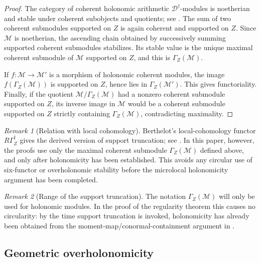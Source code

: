 \documentclass[11pt]{amsart}
\theoremstyle{plain}
\theoremstyle{definition}
\theoremstyle{remark}
\newtheorem{remark}{Remark}[section]
\begin{document}
\begin{proof}
The category of coherent holonomic arithmetic \(\mathscr D^\dagger\)-modules is
noetherian and stable under coherent subobjects and quotients; see
\cite[Th\'eor\`eme 2.2.14]{CaroHolonomieSansFrobenius}.  The sum of two
coherent submodules supported on \(Z\) is again coherent and supported on
\(Z\).  Since \(\mathcal M\) is noetherian, the ascending chain obtained by
successively summing supported coherent submodules stabilizes.  Its stable value
is the unique maximal coherent submodule of \(\mathcal M\) supported on \(Z\),
and this is \(\Gamma_Z(\mathcal M)\).

If \(f:\mathcal M\to\mathcal M'\) is a morphism of holonomic coherent modules,
the image \(f(\Gamma_Z(\mathcal M))\) is supported on \(Z\), hence lies in
\(\Gamma_Z(\mathcal M')\).  This gives functoriality.  Finally, if the quotient
\(\mathcal M/\Gamma_Z(\mathcal M)\) had a nonzero coherent submodule supported
on \(Z\), its inverse image in \(\mathcal M\) would be a coherent submodule
supported on \(Z\) strictly containing \(\Gamma_Z(\mathcal M)\), contradicting
maximality.
\end{proof}

\begin{remark}[Relation with local cohomology]
\label{rem:gamma-Z-local-cohomology}
Berthelot's local-cohomology functor \(R\Gamma_Z^\dagger\) gives the derived
version of support truncation; see \cite[\S2.1, Lemmas 2.1.1--2.1.2]{HuygheSchmidtIntermediate}.  In this paper, however, the proofs use only the
maximal coherent submodule \(\Gamma_Z(\mathcal M)\) defined above, and only after
holonomicity has been established.  This avoids any circular use of
six-functor or overholonomic stability before the microlocal holonomicity
argument has been completed.
\end{remark}

\begin{remark}[Range of the support truncation]
\label{rem:gamma-Z-holonomic-only}
The notation \(\Gamma_Z(\mathcal M)\) will only be used for holonomic modules.
In the proof of the regularity theorem this causes no circularity: by the time
support truncation is invoked, holonomicity has already been obtained from the
moment-map/conormal-containment argument in
.
\end{remark}

\subsection{Geometric overholonomicity}
\end{document}
